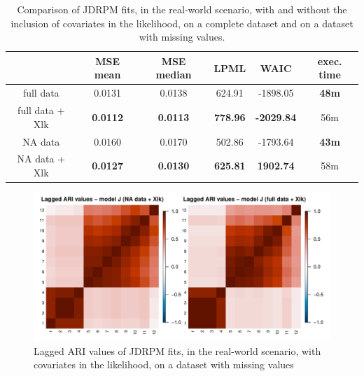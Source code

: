 \documentclass[12pt,	%
	a4paper,		%
	twoside,		%
	openright,		%
	titlepage,%
	]{book}
\theoremstyle{definition}
\begin{document}
\begin{table}[!ht]
    \caption[Comparison of JDRPM, real-world scenario, covariates in the likelihood, dataset with missing values]{Comparison of JDRPM fits, in the real-world scenario, with and without the inclusion of covariates in the likelihood, on a complete dataset and on a dataset with missing values.}
    \centering
    \begin{tabular}{cccccc}
    \toprule
            & MSE mean &  MSE median & LPML & WAIC & exec. time  \\
           \midrule 
        full data & 0.0131  & 0.0138   & 624.91 & -1898.05  &  \textbf{48m} \\
        full data + Xlk & \textbf{0.0112}  & \textbf{0.0113}   & \textbf{778.96} & \textbf{-2029.84}  &  56m \\
        \midrule
        NA data & 0.0160 &  0.0170  &  502.86 & -1793.64 & \textbf{43m}\\
        NA data + Xlk & \textbf{0.0127} &  \textbf{0.0130}  & \textbf{625.81 }& \textbf{1902.74} & 58m\\
        \bottomrule
    \end{tabular}
    \label{tab: fits metrics space julias na full xlk}
\end{table}


\begin{figure}[!ht]
    \centering
    \includegraphics[width=1\linewidth]{Testing/Covariates/NA lk improvement/ari.pdf}
    \caption[Lagged ARI values of JDRPM fit, real-world scenario, covariates in the likelihood, datacset with missing values]{Lagged ARI values of JDRPM fits, in the real-world scenario, with covariates in the likelihood, on a dataset with missing values}
    \label{fig:ari xlk}
\end{figure}
\end{document}
